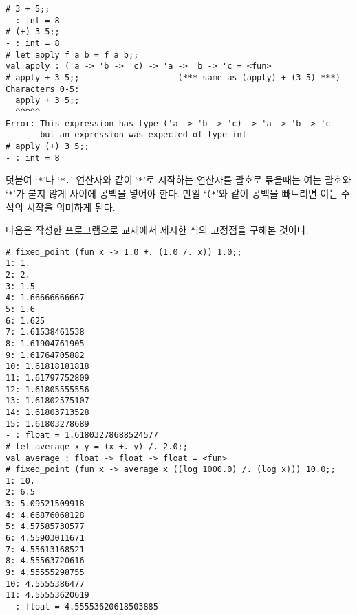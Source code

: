 \begin{lstlisting}
# 3 + 5;;
- : int = 8
# (+) 3 5;;
- : int = 8
# let apply f a b = f a b;;
val apply : ('a -> 'b -> 'c) -> 'a -> 'b -> 'c = <fun>
# apply + 3 5;;                    (*** same as (apply) + (3 5) ***)
Characters 0-5:
  apply + 3 5;;
  ^^^^^
Error: This expression has type ('a -> 'b -> 'c) -> 'a -> 'b -> 'c
       but an expression was expected of type int
# apply (+) 3 5;;
- : int = 8
\end{lstlisting}

덧붙여 `\texttt{*}'나 `\texttt{*.}' 연산자와 같이 `\texttt{*}'로 시작하는
연산자를 괄호로 묶을때는 여는 괄호와 `\texttt{*}'가 붙지 않게 사이에 공백을
넣어야 한다. 만일 `\texttt{(*}'와 같이 공백을 빠트리면 이는 주석의 시작을
의미하게 된다.

\exercise{1.33}

\exercise{1.36}

다음은 작성한 프로그램으로 교재에서 제시한 식의 고정점을 구해본 것이다.

\begin{lstlisting}[language={[Objective]Caml}]
# fixed_point (fun x -> 1.0 +. (1.0 /. x)) 1.0;;
1: 1.
2: 2.
3: 1.5
4: 1.66666666667
5: 1.6
6: 1.625
7: 1.61538461538
8: 1.61904761905
9: 1.61764705882
10: 1.61818181818
11: 1.61797752809
12: 1.61805555556
13: 1.61802575107
14: 1.61803713528
15: 1.61803278689
- : float = 1.61803278688524577
# let average x y = (x +. y) /. 2.0;;
val average : float -> float -> float = <fun>
# fixed_point (fun x -> average x ((log 1000.0) /. (log x))) 10.0;;
1: 10.
2: 6.5
3: 5.09521509918
4: 4.66876068128
5: 4.57585730577
6: 4.55903011671
7: 4.55613168521
8: 4.55563720616
9: 4.55555298755
10: 4.5555386477
11: 4.55553620619
- : float = 4.55553620618503885
\end{lstlisting}

\exercise{1.37}

\exercise{1.38}

\exercise{1.39}

\exercise{1.40}

